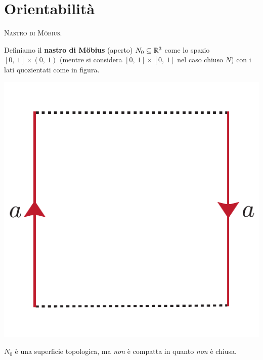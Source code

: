 \section{Orientabilità}
\begin{define}\textsc{Nastro di Möbius}.\\ \label{nastromobius}
	\begin{minipage}{.75\linewidth}
Definiamo il \textbf{nastro di Möbius} (aperto) $N_0\subseteq \mathbb{R}^3$ come lo spazio $\left[0,\ 1\right]\times (0,\ 1)$ (mentre si considera $\left[0,\ 1\right]\times [0,\ 1]$ nel caso chiuso $N$) con i lati quozientati come in figura.
	\end{minipage}
	\begin{minipage}{.14\linewidth}
		\begin{center}
			\includegraphics[trim=0cm 0cm 0cm 0cm, clip, scale=0.4]{images/openmoebius.pdf}
		\end{center}
	\end{minipage}
\end{define}
\begin{observe}
	$N_0$ è una superficie topologica, ma \textit{non} è compatta in quanto \textit{non} è chiusa.
	\vspace{-3mm}
\end{observe}
